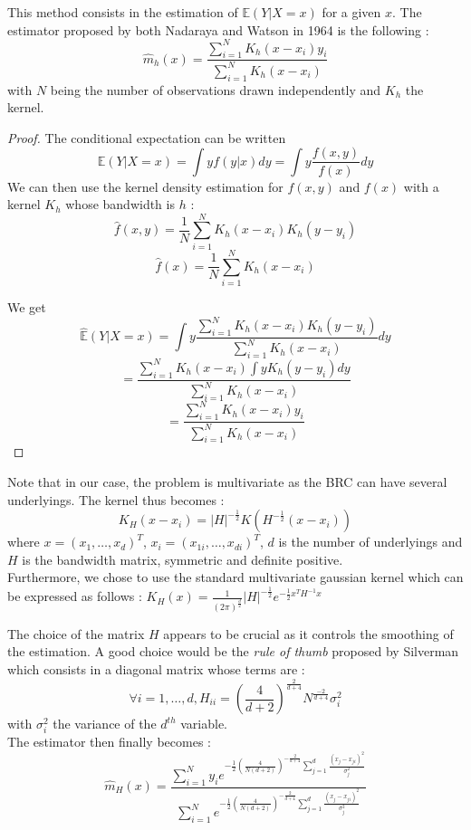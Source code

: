 \documentclass[a4paper,11pt,english]{book}
\begin{document}
This method consists in the estimation of $\mathbb{E}(Y|X=x)$ for a given $x$. The estimator proposed by both Nadaraya \cite{nadaraya1964estimating} and Watson \cite{watson1964smooth} in 1964 is the following : $$\hat{m}_{h}(x)=\frac{\sum_{i=1}^{N}K_{h}(x-x_{i})y_{i}}{\sum_{i=1}^{N}K_{h}(x-x_{i})}$$
with $N$ being the number of observations drawn independently and $K_h$ the kernel.\\

\begin{proof}
The conditional expectation can be written $$\mathbb{E}(Y|X=x)=\int yf(y|x)dy = \int y\frac{f(x,y)}{f(x)}dy$$
We can then use the kernel density estimation for $f(x,y)$ and $f(x)$ with a kernel $K_{h}$ whose bandwidth is $h$ : $$\hat{f}(x,y) = \frac{1}{N}\sum_{i=1}^{N}K_{h}(x-x_{i})K_{h}(y-y_{i})$$
$$\hat{f}(x) = \frac{1}{N}\sum_{i=1}^{N}K_{h}(x-x_{i})$$

We get $$\hat{\mathbb{E}}(Y|X=x) = \int y\frac{\sum_{i=1}^{N}K_{h}(x-x_{i})K_{h}(y-y_{i})}{\sum_{i=1}^{N}K_{h}(x-x_{i})}dy$$
$$=\frac{\sum_{i=1}^{N}K_{h}(x-x_{i})\int y K_{h}(y-y_{i})dy }{\sum_{i=1}^{N}K_{h}(x-x_{i})}$$
$$=\frac{\sum_{i=1}^{N}K_{h}(x-x_{i})y_{i}}{\sum_{i=1}^{N}K_{h}(x-x_{i})}$$
\end{proof}

Note that in our case, the problem is multivariate as the BRC can have several underlyings. The kernel thus becomes : $$K_{H}(x-x_{i}) = |H|^{-\frac{1}{2}}K(H^{-\frac{1}{2}}(x-x_{i}))$$
where $x=(x_{1},\ldots,x_{d})^{T}$, $x_{i}=(x_{1i},\ldots,x_{di})^{T}$, $d$ is the number of underlyings and $H$ is the bandwidth matrix, symmetric and definite positive.\\

Furthermore, we chose to use the standard multivariate gaussian kernel which can be expressed as follows :
$K_{H}(x)=\frac{1}{(2\pi)^{\frac{d}{2}}}|H|^{-\frac{1}{2}}e^{-\frac{1}{2}x^{T}H^{-1}x}$

The choice of the matrix $H$ appears to be crucial as it controls the smoothing of the estimation. A good choice would be the \textit{rule of thumb} proposed by Silverman \cite{silverman1986density} which consists in a diagonal matrix whose terms are : $$\forall i=1,\ldots,d, H_{ii} = (\frac{4}{d+2})^{\frac{2}{d+4}}N^{\frac{-2}{d+4}}\sigma_{i}^{2}$$
with $\sigma_{i}^{2}$ the variance of the $d^{th}$ variable.\\

The estimator then finally becomes :
$$\hat{m}_{H}(x)= \frac{\sum_{i=1}^{N}y_{i}e^{-\frac{1}{2}(\frac{4}{N(d+2)})^{-\frac{2}{d+4}}\sum_{j=1}^{d}\frac{(x_{j}-x_{ji})^{2}}{\sigma_{j}^{2}}}}{\sum_{i=1}^{N}e^{-\frac{1}{2}(\frac{4}{N(d+2)})^{-\frac{2}{d+4}}\sum_{j=1}^{d}\frac{(x_{j}-x_{ji})^{2}}{\sigma_{j}^{2}}}}$$
\end{document}
